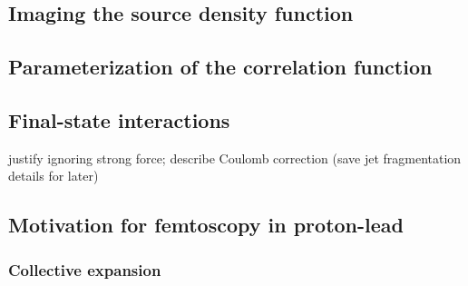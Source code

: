 \subsection{Imaging the source density function}
\subsection{Parameterization of the correlation function}
\subsection{Final-state interactions}
justify ignoring strong force; describe Coulomb correction (save jet fragmentation details for later)
\subsection{Motivation for femtoscopy in proton-lead}
\subsubsection{Collective expansion}


